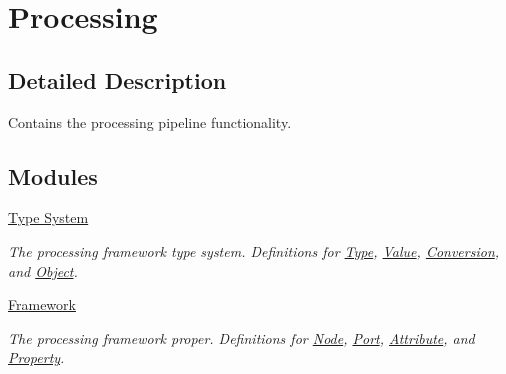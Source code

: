 \hypertarget{group___process}{}\section{Processing}
\label{group___process}


\subsection{Detailed Description}
Contains the processing pipeline functionality. 

\subsection*{Modules}
\begin{DoxyCompactItemize}
\item 
\hyperlink{group___process_type}{Type System}
\begin{DoxyCompactList}\small\item\em The processing framework type system. Definitions for \hyperlink{classdg_1_1deepcore_1_1_type}{Type}, \hyperlink{classdg_1_1deepcore_1_1_value}{Value}, \hyperlink{classdg_1_1deepcore_1_1_conversion}{Conversion}, and \hyperlink{classdg_1_1deepcore_1_1_object}{Object}. \end{DoxyCompactList}\item 
\hyperlink{group___process_framework}{Framework}
\begin{DoxyCompactList}\small\item\em The processing framework proper. Definitions for \hyperlink{classdg_1_1deepcore_1_1_node}{Node}, \hyperlink{classdg_1_1deepcore_1_1_port}{Port}, \hyperlink{classdg_1_1deepcore_1_1_attribute}{Attribute}, and \hyperlink{classdg_1_1deepcore_1_1_property}{Property}. \end{DoxyCompactList}\end{DoxyCompactItemize}
